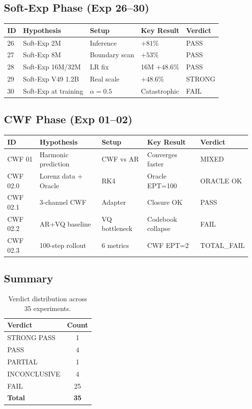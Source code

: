 \documentclass{article}
\begin{document}
\subsection{Soft-Exp Phase (Exp 26--30)}

\begin{table}[h]
\centering
\small
\begin{tabular}{p{1.5cm}p{3.5cm}p{3.5cm}p{3cm}p{1.5cm}}
\toprule
ID & Hypothesis & Setup & Key Result & Verdict \\
\midrule
26 & Soft-Exp 2M & Inference & $+81\%$ & PASS \\
27 & Soft-Exp 8M & Boundary scan & $+53\%$ & PASS \\
28 & Soft-Exp 16M/32M & LR fix & 16M $+48.6\%$ & PASS \\
29 & Soft-Exp V49 1.2B & Real scale & $+48.6\%$ & STRONG \\
30 & Soft-Exp at training & $\alpha = 0.5$ & Catastrophic & FAIL \\
\bottomrule
\end{tabular}
\end{table}

\subsection{CWF Phase (Exp 01--02)}

\begin{table}[h]
\centering
\small
\begin{tabular}{p{2cm}p{3.5cm}p{3.5cm}p{3cm}p{1.5cm}}
\toprule
ID & Hypothesis & Setup & Key Result & Verdict \\
\midrule
CWF 01 & Harmonic prediction & CWF vs AR & Converges faster & MIXED \\
CWF 02.0 & Lorenz data + Oracle & RK4 & Oracle EPT=100 & ORACLE OK \\
CWF 02.1 & 3-channel CWF & Adapter & Closure OK & PASS \\
CWF 02.2 & AR+VQ baseline & VQ bottleneck & Codebook collapse & FAIL \\
CWF 02.3 & 100-step rollout & 6 metrics & CWF EPT=2 & TOTAL\_FAIL \\
\bottomrule
\end{tabular}
\end{table}

\subsection{Summary}

\begin{table}[h]
\centering
\small
\begin{tabular}{lc}
\toprule
Verdict & Count \\
\midrule
STRONG PASS & 1 \\
PASS & 4 \\
PARTIAL & 1 \\
INCONCLUSIVE & 4 \\
FAIL & 25 \\
\midrule
\textbf{Total} & \textbf{35} \\
\bottomrule
\end{tabular}
\caption{Verdict distribution across 35 experiments.}
\end{table}
\end{document}
